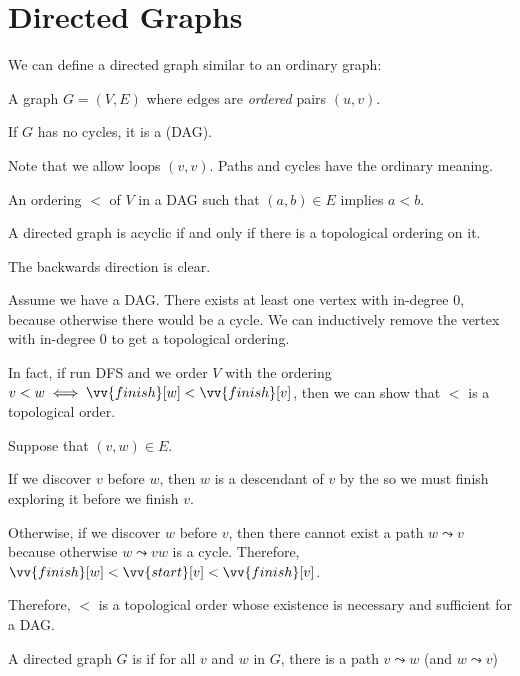\section{Directed Graphs}

We can define a directed graph similar to an ordinary graph:

\begin{defn}
  A graph $G = (V, E)$ where edges are \emph{ordered} pairs $(u, v)$.

  If $G$ has no cycles, it is a  (DAG).
\end{defn}

Note that we allow loops $(v, v)$.
Paths and cycles have the ordinary meaning.

\begin{defn}
  An ordering $<$ of $V$ in a DAG such that $(a,b) \in E$ implies $a < b$.
\end{defn}

\begin{prop}
  A directed graph is acyclic if and only if there is a topological ordering on it.
\end{prop}
\begin{prf}
  The backwards direction is clear.

  Assume we have a DAG.
  There exists at least one vertex with in-degree 0,
  because otherwise there would be a cycle.
  We can inductively remove the vertex with in-degree 0 to get a topological ordering.

  In fact, if run DFS and we order $V$ with the ordering
  $v < w \iff \vv{finish}[w] < \vv{finish}[v]$,
  then we can show that $<$ is a topological order.

  Suppose that $(v, w) \in E$.

  If we discover $v$ before $w$, then $w$ is a descendant of $v$
  by the  so we must finish exploring it before we finish $v$.

  Otherwise, if we discover $w$ before $v$,
  then there cannot exist a path $w \leadsto v$
  because otherwise $w \leadsto vw$ is a cycle.
  Therefore, $\vv{finish}[w] < \vv{start}[v] < \vv{finish}[v]$.

  Therefore, $<$ is a topological order whose existence
  is necessary and sufficient for a DAG.
\end{prf}

\begin{defn*}
  A directed graph $G$ is  if for all $v$ and $w$ in $G$,
  there is a path $v \leadsto w$ (and $w \leadsto v$)
\end{defn*}

